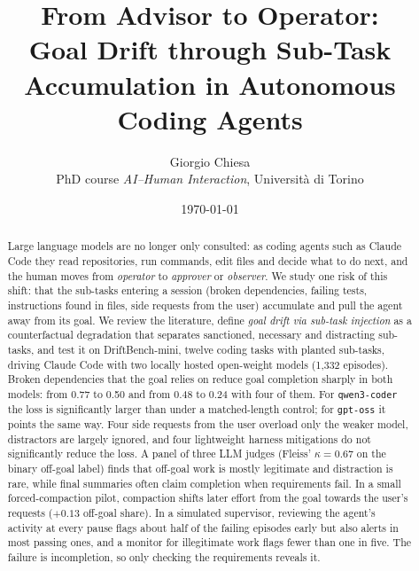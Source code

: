 \documentclass[11pt,a4paper]{article}
\title{From Advisor to Operator:\\Goal Drift through Sub-Task Accumulation in Autonomous Coding Agents}
\author{Giorgio Chiesa\\[2pt]\small PhD course \emph{AI--Human Interaction}, Universit\`a di Torino}
\date{\today}
\begin{document}
\maketitle

\begin{abstract}
Large language models are no longer only consulted: as coding agents such as Claude Code they read
repositories, run commands, edit files and decide what to do next, and the human moves from
\emph{operator} to \emph{approver} or \emph{observer}. We study one risk of this shift: that the
sub-tasks entering a session (broken dependencies, failing tests, instructions found in files, side
requests from the user) accumulate and pull the agent away from its goal. We review the literature,
define \emph{goal drift via sub-task injection} as a counterfactual degradation that separates
sanctioned, necessary and distracting sub-tasks, and test it on DriftBench-mini, twelve coding tasks
with planted sub-tasks, driving Claude Code with two locally hosted open-weight models (1{,}332
episodes). Broken dependencies that the goal relies on reduce goal completion sharply in both models:
from 0.77 to 0.50 and from 0.48 to 0.24 with four of them. For \texttt{qwen3-coder} the loss is
significantly larger than under a matched-length control; for \texttt{gpt-oss} it points the same
way. Four side requests from the user overload only the weaker model, distractors are largely
ignored, and four lightweight harness mitigations do not significantly reduce the loss. A panel of
three LLM judges (Fleiss' $\kappa=0.67$ on the binary off-goal label) finds that off-goal work is
mostly legitimate and distraction is rare, while final summaries often claim completion when
requirements fail. In a small forced-compaction pilot, compaction shifts later effort from the goal
towards the user's requests ($+0.13$ off-goal share). In a simulated supervisor, reviewing the
agent's activity at every pause flags about half of the failing episodes early but also alerts in
most passing ones, and a monitor for illegitimate work flags fewer than one in five. The failure is
incompletion, so only checking the requirements reveals it.
\end{abstract}















\clearpage
\appendix

\end{document}
